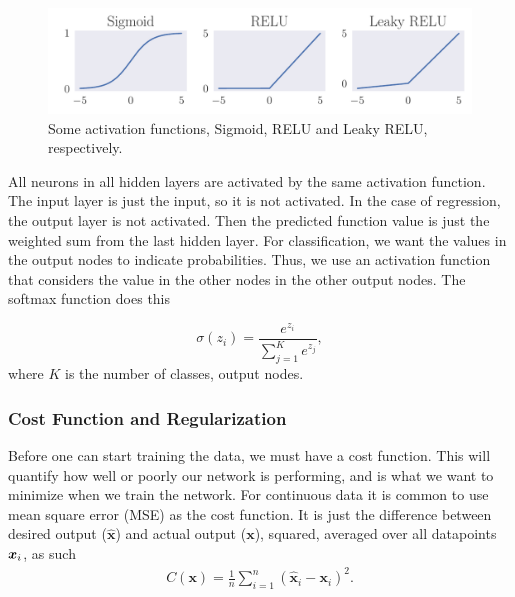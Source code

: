 \documentclass[12pt]{extarticle}
\begin{document}
\begin{figure}[h]
	\includegraphics[width=\linewidth]{pictures/activation_functions.pdf}
	\caption{Some activation functions, Sigmoid, RELU and Leaky RELU, respectively.}\label{fig:activation_functions}
\end{figure}

All neurons in all hidden layers are activated by the same activation function. The input layer is just the input, so it is not activated. In the case of regression, the output layer is not activated. Then the predicted function value is just the weighted sum from the last hidden layer. For classification, we want the values in the output nodes to indicate probabilities. Thus, we use an activation function that considers the value in the other nodes in the other output nodes. The softmax function does this

\begin{equation}
	\sigma(z_i) = \frac{e^{z_i}}{\sum_{j=1}^Ke^{z_j}},
\end{equation}
where $K$ is the number of classes, output nodes.

\subsubsection{Cost Function and Regularization}\label{sec:cost_func_and_regul}
Before one can start training the data, we must have a cost function. This will quantify how well or poorly our network is performing, and is what we want to minimize when we train the network. For continuous data it is common to use mean square error (MSE) as the cost function. It is just the difference between desired output ($\hat{\mathbf{x}}$) and actual output ($\mathbf{x}$), squared, averaged over all datapoints $\boldsymbol x_i$, as such
\begin{align}
	C(\mathbf{x}) = \frac{1}{n}\sum_{i=1}^{n}(\hat{\mathbf{x}}_i - \mathbf{x}_i)^2.
	\label{eq:MSE}
\end{align}
\end{document}
